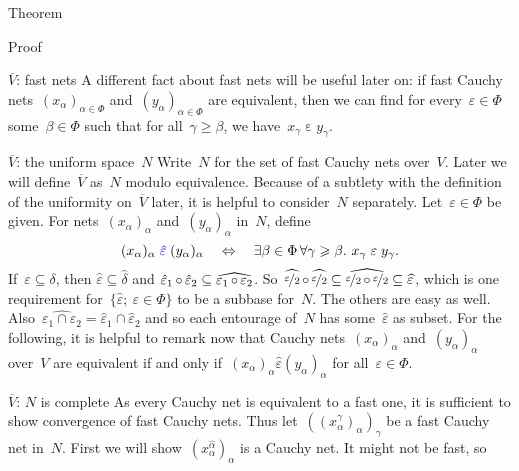 \begin{parsec}
\begin{point}{Theorem}
\begin{point}{Proof}
\begin{point}{$\overline{V}$: fast nets}
A different fact about fast nets will be useful later on:
if fast Cauchy nets~$(x_\alpha)_{\alpha \in \Phi}$
    and~$(y_\alpha)_{\alpha \in \Phi}$ are equivalent,
    then we can find for every~$\varepsilon \in \Phi$
    some~$\beta \in \Phi$
    such that for all~$\gamma \geq \beta$,
    we have~$x_\gamma \mathrel{\varepsilon} y_\gamma$.
\end{point}
\begin{point}{$\overline{V}$: the uniform space~$N$}%
Write~$N$ for the set of fast Cauchy nets over~$V$.
Later we will define~$\overline{V}$ as~$N$ modulo equivalence.
Because of a subtlety with the definition of the uniformity
    on~$\overline{V}$ later,
    it is helpful to consider~$N$ separately.
Let~$\varepsilon \in \Phi$ be given.
For nets~$(x_\alpha)_{\alpha}$
    and~$(y_\alpha)_{\alpha}$ in~$N$,
    define
    \begin{equation*}
        (x_\alpha)_\alpha \mathrel{\Define{\hat\varepsilon}\index{epsi@$\hat\varepsilon$}}
            (y_\alpha)_\alpha
            \quad\Leftrightarrow\quad
        \exists \beta \in \Phi \, \forall \gamma \geq \beta. \ 
        x_\gamma \mathrel{\varepsilon} y_\gamma.
    \end{equation*}
If~$\varepsilon \subseteq \delta$,
then $\hat\varepsilon \subseteq \hat\delta$
and
$\hat\varepsilon_1 \mathop{\circ} \hat\varepsilon_2 
\subseteq\widehat{\varepsilon_1 \mathop{\circ} \varepsilon_2}$.
So~$
\widehat{\nicefrac{\varepsilon}{2}} \mathop{\circ}
\widehat{\nicefrac{\varepsilon}{2}} \subseteq
\widehat{\nicefrac{\varepsilon}{2} \mathop{\circ}
\nicefrac{\varepsilon}{2}} \subseteq \widehat{\varepsilon}$,
which is one requirement for~$\{ \hat\varepsilon; \ \varepsilon \in \Phi\}$
to be a subbase for~$N$.
The others are easy as well. 
Also~$\widehat{\varepsilon_1 \cap \varepsilon_2} = \hat{\varepsilon}_1
    \cap \hat{\varepsilon}_2$
    and so each entourage of~$N$ has some~$\hat\varepsilon$ as subset.
For the following,
    it is helpful to remark now
    that Cauchy nets~$(x_\alpha)_\alpha$ and~$(y_\alpha)_\alpha$ over~$V$
    are equivalent if and only if~$(x_\alpha)_\alpha \mathrel{\hat\varepsilon}
    (y_\alpha)_\alpha$ for all~$\varepsilon \in \Phi$.
\end{point}
\begin{point}{$\overline{V}$: $N$ is complete}%
As every Cauchy net is equivalent to a fast one,
it is sufficient to show convergence of fast Cauchy nets.
Thus let~$((x^\gamma_\alpha)_\alpha)_\gamma$
    be a fast Cauchy net in~$N$.
First we will show~$(x^{\hat\alpha}_\alpha)_\alpha$
    is a Cauchy net.
It might not be fast, so

\end{point}
\end{point}
\end{point}
\end{parsec}
